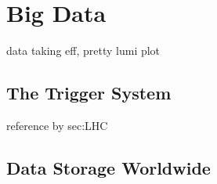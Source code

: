 \chapter{Big Data\label{ch:data}}

data taking eff, pretty lumi plot

\section{The Trigger System\label{sec:trigger}}
reference by sec:LHC

\section{Data Storage Worldwide\label{sec:storage}}



